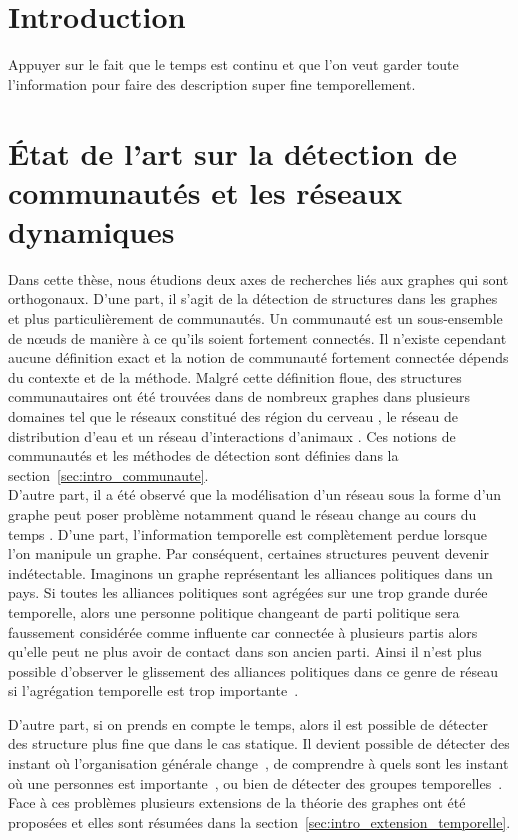 
\chapter*{Introduction}

Appuyer sur le fait que le temps est continu et que l'on veut garder toute l'information pour faire des description super fine temporellement.

\chapter{État de l'art sur la détection de communautés et les réseaux dynamiques}
\minitoc
\label{chap:etat_art}
Dans cette thèse, nous étudions deux axes de recherches liés aux graphes qui sont orthogonaux.
D'une part, il s'agit de la détection de structures dans les graphes et plus particulièrement de communautés.
Un communauté est un sous-ensemble de n\oe uds de manière à ce qu'ils soient fortement connectés.
Il n'existe cependant aucune définition exact et la notion de communauté fortement connectée dépends du contexte et de la méthode.
Malgré cette définition floue, des structures communautaires ont été trouvées dans de nombreux graphes dans plusieurs domaines tel que le réseaux constitué des région du cerveau \cite{DeReus2014}, le réseau de distribution d'eau \cite{DiNardo2015} et un réseau d'interactions d'animaux \cite{Farine2015}.
Ces notions de communautés et les méthodes de détection sont définies dans la section~\ref{sec:intro_communaute}.\\

D'autre part, il a été observé que la modélisation d'un réseau sous la forme d'un graphe peut poser problème notamment quand le réseau change au cours du temps \cite{Holme2015b}.
D'une part, l'information temporelle est complètement perdue lorsque l'on manipule un graphe.
Par conséquent, certaines structures peuvent devenir indétectable.
Imaginons un graphe représentant les alliances politiques dans un pays.
Si toutes les alliances politiques sont agrégées sur une trop grande durée temporelle, alors une personne politique changeant de parti politique sera faussement considérée comme influente car connectée à plusieurs partis alors qu'elle peut ne plus avoir de contact dans son ancien parti.
Ainsi il n'est plus possible d'observer le glissement des alliances politiques dans ce genre de réseau si l'agrégation temporelle est trop importante~\cite{Mucha2010}.

D'autre part, si on prends en compte le temps, alors il est possible de détecter des structure plus fine que dans le cas statique.
Il devient possible de détecter des instant où l'organisation générale change~\cite{Rosvall2010}, de comprendre à quels sont les instant où une personnes est importante~\cite{Magnien2015}, ou bien de détecter des groupes temporelles~\cite{Cazabet2010}.
Face à ces problèmes plusieurs extensions de la théorie des graphes ont été proposées et elles sont résumées dans la section~\ref{sec:intro_extension_temporelle}.

